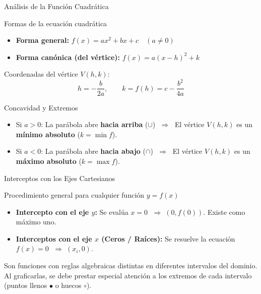 \documentclass[aspectratio=169]{beamer}
\begin{document}
\begin{frame}{Análisis de la Función Cuadrática}
  \begin{block}{Formas de la ecuación cuadrática}
    \begin{itemize}
      \item \textbf{Forma general:} $f(x) = ax^2 + bx + c \quad (a \neq 0)$
      \item \textbf{Forma canónica (del vértice):} $f(x) = a(x - h)^2 + k$
    \end{itemize}
    Coordenadas del vértice $V(h, k)$:
    $$h = -\frac{b}{2a}, \qquad k = f(h) = c - \frac{b^2}{4a}$$
  \end{block}

  \vspace{4pt}
  \begin{alertblock}{Concavidad y Extremos}
    \begin{itemize}
      \item Si $a > 0$: La parábola abre \textbf{hacia arriba} ($\cup$) $\;\Longrightarrow\;$ El vértice $V(h, k)$ es un \textbf{mínimo absoluto} ($k = \min f$).
      \item Si $a < 0$: La parábola abre \textbf{hacia abajo} ($\cap$) $\;\Longrightarrow\;$ El vértice $V(h, k)$ es un \textbf{máximo absoluto} ($k = \max f$).
    \end{itemize}
  \end{alertblock}
\end{frame}

\begin{frame}{Interceptos con los Ejes Cartesianos}
  \begin{block}{Procedimiento general para cualquier función $y = f(x)$}
    \begin{itemize}
      \item \textbf{Intercepto con el eje $y$:} Se evalúa $x = 0$ $\;\Longrightarrow\; (0, f(0))$. Existe como máximo uno.
      \item \textbf{Interceptos con el eje $x$ (Ceros / Raíces):} Se resuelve la ecuación $f(x) = 0$ $\;\Longrightarrow\; (x_i, 0)$.
    \end{itemize}
  \end{block}

  \vspace{4pt}
  \begin{mwextra}
    Son funciones con reglas algebraicas distintas en diferentes intervalos del dominio. Al graficarlas, se debe prestar especial atención a los extremos de cada intervalo (puntos llenos $\bullet$ o huecos $\circ$).
  \end{mwextra}
\end{frame}
\end{document}
